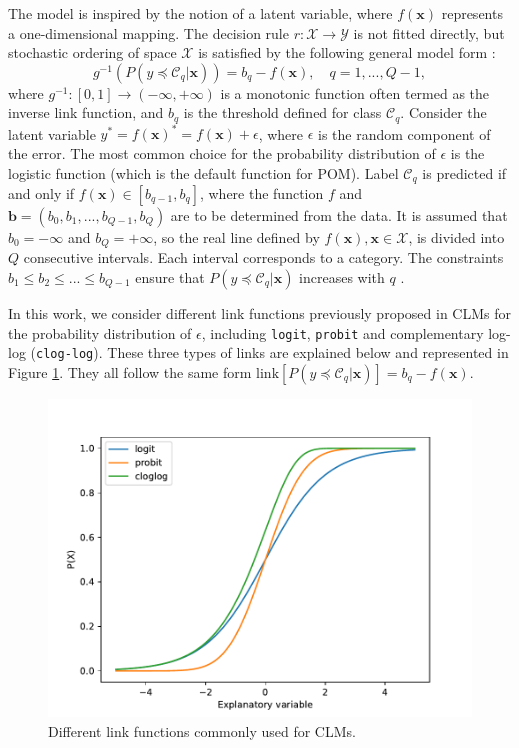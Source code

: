 \documentclass[preprint]{elsarticle}
\begin{document}
The model is inspired by the notion of a latent variable, where $f(\textbf{x})$ represents a one-dimensional mapping. The decision rule $r: \mathcal{X} \rightarrow \mathcal{Y}$ is not fitted directly, but stochastic ordering of space $\mathcal{X}$ is satisfied by the following general model form \cite{herbrich2000large}:
\begin{equation}
\nonumber
g^{-1}(P(y \preceq \mathcal{C}_q | \mathbf{x})) = b_q - f(\mathbf{x}), \quad q = 1, ..., Q-1,
\end{equation}
where $g^{-1} : [0,1] \rightarrow (-\infty, +\infty)$ is a monotonic function often termed as the inverse link function, and $b_q$ is the threshold defined for class $\mathcal{C}_q$. Consider the latent variable $y^* = f(\mathbf{x})^* = f(\mathbf{x}) + \epsilon$, where $\epsilon$ is the random component of the error. The most common choice for the probability distribution of $\epsilon$ is the logistic function (which is the default function for POM). Label $\mathcal{C}_q$ is predicted if and only if $f(\mathbf{x}) \in [b_{q-1}, b_q]$, where the function $f$ and $\mathbf{b} = (b_0, b_1, ..., b_{Q-1}, b_Q)$ are to be determined from the data. It is assumed that $b_0 = -\infty$ and $b_Q = +\infty$, so the real line defined by $f(\textbf{x}), \textbf{x} \in \mathcal{X}$, is divided into $Q$ consecutive intervals. Each interval corresponds to a category. The constraints $b_1 \le b_2 \le ... \le b_{Q-1}$ ensure that $P(y \preceq \mathcal{C}_q | \mathbf{x})$ increases with $q$ \cite{mccullagh1980regression}.

In this work, we consider different link functions previously proposed in CLMs for the probability distribution of $\epsilon$, including \texttt{logit}, \texttt{probit} and complementary log-log (\texttt{clog-log}). These three types of links are explained below and represented in Figure \ref{fig:linkfunctions}. They all follow the same form $\text{link}[P(y \preceq \mathcal{C}_q | \mathbf{x})] = b_q - f(\mathbf{x})$.

\begin{figure}[!t]
	\centering
	\includegraphics[width=\columnwidth]{img/linkfunctions.pdf}
	\caption{Different link functions commonly used for CLMs.}
	\label{fig:linkfunctions}
\end{figure}
\end{document}

